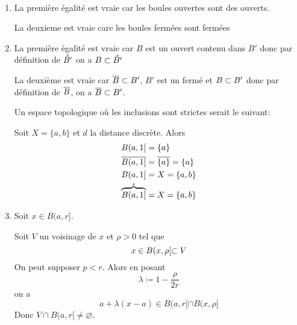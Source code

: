 \documentclass[french,a4paper,10pt]{article}
\begin{document}
    \begin{td-sol}\,
        \begin{enumerate}
            \item La première égalité est vraie car les boules ouvertes sont des ouverts.

            La deuxieme est vraie care les boules fermées sont fermées
            
            \item La première égalité est vraie car $B$ est un ouvert contenu dans $B'$ donc par définition de 
            $\mathring{B'}$ on a $B\subset\mathring{B'}$

            La deuxième est vraie car $\overline{B}\subset B'$, $B'$ est un fermé et $B\subset B'$
            donc par définition de $\overline{B}$, on a $\overline{B}\subset B'$.

            Un espace topologique où les inclusions sont strictes serait le suivant:

            Soit $X=\{a,b\}$ et $d$ la distance discrète. Alors
            \[\begin{aligned}
                B(a,1[&=\{a\}\\
                \overline{B(a,1[}&=\overline{\{a\}}=\{a\}\\
                B(a,1]&=X=\{a,b\}\\
                \mathring{\overbrace{B(a,1]}}&=X=\{a,b\}
            \end{aligned}\]

            \item Soit $x\in B(a,r]$.

            Soit $V$ un voisinage de $x$ et $\rho >0$ tel que 
                \[
                    x\in B(x,\rho[\subset V
                \]
                On peut supposer $p<r$. Alors en posant
                \[
                    \lambda\coloneq 1-\frac\rho{2r}
                    \]
                    on a
                    \[
                        a+\lambda(x-a)\in B(a,r[\cap B(x,\rho[\]
                Donc $V\cap B(a,r[\ne \varnothing$.

            

\end{enumerate}
\end{td-sol}
\end{document}
